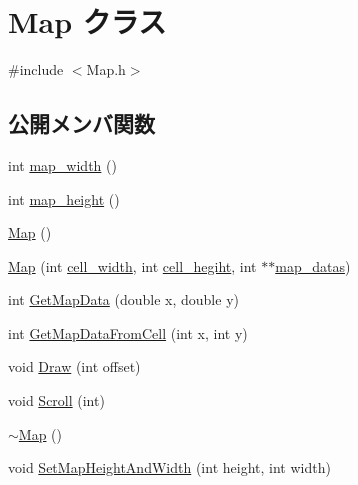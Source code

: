 \hypertarget{class_map}{\section{Map クラス}
\label{class_map}
}


{\ttfamily \#include $<$Map.\+h$>$}

\subsection*{公開メンバ関数}
\begin{DoxyCompactItemize}
\item 
int \hyperlink{class_map_acc81681ce21cb77b686446de8054c873}{map\+\_\+width} ()
\item 
int \hyperlink{class_map_ad31ca4e58bc9aee366f4472b0d2caac0}{map\+\_\+height} ()
\item 
\hyperlink{class_map_a0f5ad0fd4563497b4214038cbca8b582}{Map} ()
\item 
\hyperlink{class_map_ae29ba970735d81d37a8c09e7e1b5a97f}{Map} (int \hyperlink{class_map_a9a14e00ff8843f4eed904f0dbe4b19dd}{cell\+\_\+width}, int \hyperlink{class_map_ad4c7bd28ec6d1b2e1e996686d5634bbc}{cell\+\_\+hegiht}, int $\ast$$\ast$\hyperlink{class_map_aebd3aa405509dae6a3a63edad08eaf63}{map\+\_\+datas})
\item 
int \hyperlink{class_map_a49a50b1bb8e6ae4f311ca730e683eae1}{Get\+Map\+Data} (double x, double y)
\item 
int \hyperlink{class_map_ae1b09990bb55f9e799a8845453975e04}{Get\+Map\+Data\+From\+Cell} (int x, int y)
\item 
void \hyperlink{class_map_a450160bcc89fd82cd1ccc7ed44c6542f}{Draw} (int offset)
\item 
void \hyperlink{class_map_a09797f6a2c27a7966f07498676080ff3}{Scroll} (int)
\item 
\hyperlink{class_map_aa403fbe09394ccf39747588f5168e3b2}{$\sim$\+Map} ()
\item 
void \hyperlink{class_map_a492de80615b6aeebb98b6b3fef47b243}{Set\+Map\+Height\+And\+Width} (int height, int width)
\end{DoxyCompactItemize}
